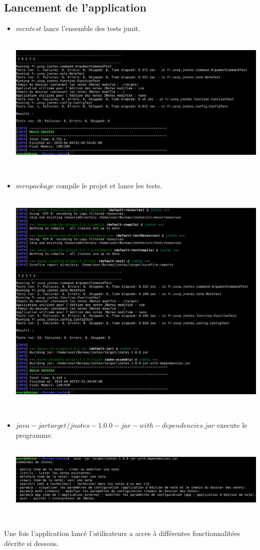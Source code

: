 \documentclass[a4paper,11pt]{article}
\begin{document}
		\subsection{Lancement de l'application}
		\begin{itemize}
				\item $mvn test$ lance l'ensemble des tests junit.\\
				\\
				\centerline{\includegraphics[scale=0.4]{Captures/test.png}}
				\\
				\item $mvn package$ compile le projet et lance les tests.\\
				\\
				\centerline{\includegraphics[scale=0.4]{Captures/mvnpackage.png}}
				\\
				\item $java -jar target/jnotes-1.0.0-jar-with-dependencies.jar $ execute le programme.\\
				\\
				\centerline{\includegraphics[scale=0.4]{Captures/ecranacceuil.png}}
				\\
			\end{itemize}
		Une fois l'application lancé l'utilisateurs a acces à différentes fonctionnalitées décrite si dessous.
\end{document}
